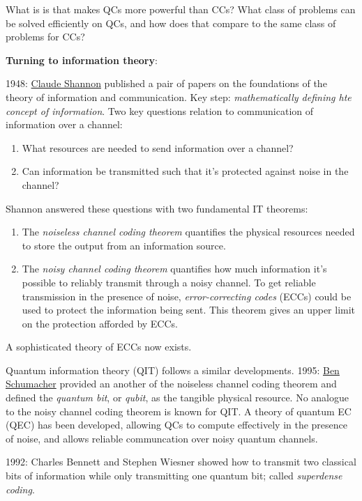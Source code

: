 \documentclass{article}
\begin{document}
What is is that makes QCs more powerful than CCs? What class of problems can be solved efficiently on QCs, and how does that compare to the same class of problems for CCs?

\textbf{Turning to information theory}:

1948: \href{https://en.wikipedia.org/wiki/Claude_Shannon}{Claude Shannon} published a pair of papers on the foundations of the theory of information and communication. Key step: \textit{mathematically defining hte concept of information}. Two key questions relation to communication of information over a channel:

\begin{enumerate}
\item What resources are needed to send information over a channel?
\item Can information be transmitted such that it's protected against noise in the channel?
\end{enumerate}

Shannon answered these questions with two fundamental IT theorems:

\begin{enumerate}
\item The \textit{noiseless channel coding theorem} quantifies the physical resources needed to store the output from an information source.
\item The \textit{noisy channel coding theorem} quantifies how much information it's possible to reliably transmit through a noisy channel. To get reliable transmission in the presence of noise, \textit{error-correcting codes} (ECCs) could be used to protect the information being sent. This theorem gives an upper limit on the protection afforded by ECCs.
\end{enumerate}

A sophisticated theory of ECCs now exists.

Quantum information theory (QIT) follows a similar developments. 1995: \href{https://en.wikipedia.org/wiki/Benjamin_Schumacher}{Ben Schumacher} provided an another of the noiseless channel coding theorem and defined the \textit{quantum bit}, or \textit{qubit}, as the tangible physical resource. No analogue to the noisy channel coding theorem is known for QIT. A theory of quantum EC (QEC) has been developed, allowing QCs to compute effectively in the presence of noise, and allows reliable communcation over noisy quantum channels.

1992: Charles Bennett and Stephen Wiesner showed how to transmit two classical bits of information while only transmitting one quantum bit; called \textit{superdense coding}.
\end{document}
